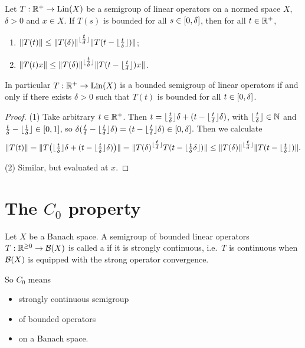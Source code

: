 \begin{lemma} \label{normBoundFromSemigroupEquation}
Let $T:\mathbb{R}^+\to \operatorname{Lin}(X)$ be a semigroup of linear operators on a normed space $X$, $\delta > 0$ and $x\in X$. If $T(s)$ is bounded for all $s\in \interval{0,\delta}$, then for all $t\in \mathbb{R}^+$,
\begin{enumerate}
\item $\lVert T(t)\rVert \leq \lVert T(\delta)\rVert^{\lfloor\tfrac{t}{\delta}\rfloor}\lVert T(t-\lfloor\tfrac{t}{\delta}\rfloor)\rVert$;
\item $\lVert T(t)x\rVert \leq \lVert T(\delta)\rVert^{\lfloor\tfrac{t}{\delta}\rfloor}\lVert T(t-\lfloor\tfrac{t}{\delta}\rfloor)x\rVert$.
\end{enumerate}
In particular $T:\mathbb{R}^+\to \operatorname{Lin}(X)$ is a bounded semigroup of linear operators \textup{if and only if} there exists $\delta > 0$ such that $T(t)$ is bounded for all $t\in \interval{0,\delta}$.
\end{lemma}
\begin{proof}
(1) Take arbitrary $t \in \mathbb{R}^+$. Then $t = \lfloor\frac{t}{\delta}\rfloor\delta + (t-\lfloor\frac{t}{\delta}\rfloor\delta)$, with $\lfloor\frac{t}{\delta}\rfloor\in \mathbb{N}$ and $\frac{t}{\delta} - \floor{\frac{t}{\delta}} \in \interval{0,1}$, so $\delta(\frac{t}{\delta}-\floor{\frac{t}{\delta}}\delta) = (t-\floor{\frac{t}{\delta}}\delta)\in \interval{0,\delta}$. Then we calculate
\[ \lVert T(t)\rVert = \lVert T\big(\lfloor\tfrac{t}{\delta}\rfloor\delta + (t-\lfloor\tfrac{t}{\delta}\rfloor\delta)\big)\rVert = \lVert T(\delta)^{\lfloor\tfrac{t}{\delta}\rfloor}T(t-\lfloor\tfrac{t}{\delta}\delta\rfloor)\rVert \leq \lVert T(\delta)\rVert^{\lfloor\tfrac{t}{\delta}\rfloor}\lVert T(t-\lfloor\tfrac{t}{\delta}\rfloor)\rVert. \]

(2) Similar, but evaluated at $x$.
\end{proof}




\section{The $C_0$ property}
\begin{definition}
Let $X$ be a Banach space. A semigroup of bounded linear operators $T: \mathbb{R}^{\geq 0} \to \operatorname{\mathcal{B}}(X)$ is called a  if it is strongly continuous, i.e.\ $T$ is continuous when $\operatorname{\mathcal{B}}(X)$ is equipped with the strong operator convergence.

So $C_0$ means
\begin{itemize}
\item strongly continuous semigroup
\item of bounded operators
\item on a Banach space.
\end{itemize}
\end{definition}


